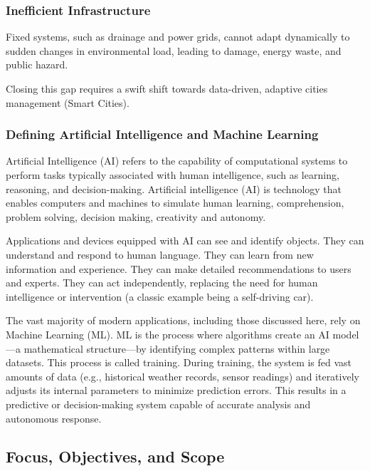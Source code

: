 \documentclass[12pt]{article}
\begin{document}
\subsubsection{Inefficient Infrastructure} Fixed systems, such as drainage and power grids, cannot adapt dynamically to 
sudden changes in environmental load, leading to damage, energy waste, and public hazard.

Closing this gap requires a swift shift towards data-driven, adaptive cities management (Smart Cities).

\subsubsection{Defining Artificial Intelligence and Machine Learning}

Artificial Intelligence (AI) refers to the capability of computational systems to perform tasks typically associated 
with human intelligence, such as learning, reasoning, and decision-making. Artificial intelligence (AI) is technology that 
enables computers and machines to simulate human learning, comprehension, problem solving, decision making, creativity and autonomy.

Applications and devices equipped with AI can see and identify objects. They can understand and respond to human language. 
They can learn from new information and experience. They can make detailed recommendations to users and experts. They can act 
independently, replacing the need for human intelligence or intervention (a classic example being a self-driving car)\cite{ibmThinkAI}.

The vast majority of modern applications, 
including those discussed here, rely on Machine Learning (ML). ML is the process where algorithms create an AI model—a 
mathematical structure—by identifying complex patterns within large datasets. This process is called training. During training, 
the system is fed vast amounts of data (e.g., historical weather records, sensor readings) and iteratively adjusts its internal 
parameters to minimize prediction errors. This results in a predictive or decision-making system capable of accurate analysis 
and autonomous response.

\subsection{Focus, Objectives, and Scope}
\end{document}
